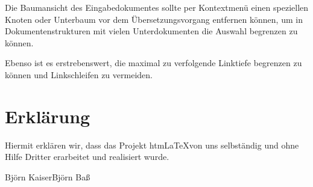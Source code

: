\documentclass[	a4paper,		%
		titlepage, 		%
		fontsize=12pt		%
		]{scrartcl} 		%
\begin{document}
Die Baumansicht des Eingabedokumentes sollte per Kontextmenü einen speziellen Knoten oder Unterbaum vor dem Übersetzungsvorgang entfernen können, um in Dokumentenstrukturen mit vielen Unterdokumenten die Auswahl begrenzen zu können.

Ebenso ist es erstrebenswert, die maximal zu verfolgende Linktiefe begrenzen zu können und Linkschleifen zu vermeiden.



%

\newpage
% 
% 

\appendix
\section{Erklärung}
Hiermit erklären wir, dass das Projekt htm\LaTeX von uns selbständig und ohne Hilfe Dritter erarbeitet und realisiert wurde.

\vspace{3cm}
\noindent
\hrulefill \hfill \hrulefill \newline
Björn Kaiser\hfill Björn Baß
\newpage
\newpage	%
\end{document}
